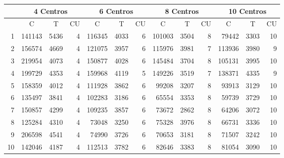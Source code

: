 \documentclass{article}
\begin{document}
  \begin{center}
    \begin{tabular}{ | r | r | r | r | r | r | r | r | r | r | r | r | r | }
      \hline
      \rowcolor{DarkGrey}
      & \multicolumn{3}{|c|}{4 Centros} & \multicolumn{3}{c|}{6 Centros} & \multicolumn{3}{|c|}{8 Centros} & \multicolumn{3}{|c|}{10 Centros} \\ \hline
      \rowcolor{DarkGrey}
      \multicolumn{1}{|c|}{Réplica} & \multicolumn{1}{|c|}{C} & \multicolumn{1}{|c|}{T} & \multicolumn{1}{|c|}{CU} & \multicolumn{1}{|c|}{C} & \multicolumn{1}{|c|}{T} & \multicolumn{1}{|c|}{CU} & \multicolumn{1}{|c|}{C} & \multicolumn{1}{|c|}{T} & \multicolumn{1}{|c|}{CU} & \multicolumn{1}{|c|}{C} & \multicolumn{1}{|c|}{T} & \multicolumn{1}{|c|}{CU} \\ \hline \hline
      1 & 141143 & 5436 & 4 & 116345 & 4033 & 6 & 101003 & 3504 & 8 & 79442 & 3303 & 10 \\ \hline
      \rowcolor{LightGrey}
      2 & 156574 & 4669 & 4 & 121075 & 3957 & 6 & 115976 & 3981 & 7 & 113936 & 3980 & 9 \\ \hline
      3 & 219954 & 4073 & 4 & 150877 & 4028 & 6 & 145484 & 3704 & 8 & 105131 & 3995 & 10 \\ \hline
      \rowcolor{LightGrey}
      4 & 199729 & 4353 & 4 & 159968 & 4119 & 5 & 149226 & 3519 & 7 & 138371 & 4335 & 9\\ \hline
      5 & 158359 & 4012 & 4 & 111928 & 3862 & 6 & 99208 & 3207 & 8 & 93913 & 3129 & 10\\ \hline
      \rowcolor{LightGrey}
      6 & 135497 & 3841 & 4 & 102283 & 3186 & 6 & 65554 & 3353 & 8 & 59739 & 3729 & 10  \\ \hline
      7 & 150857 & 4299 & 4 & 109235 & 3857 & 6 & 73672 & 2862 & 8 & 64206 & 3072 & 10  \\ \hline
      \rowcolor{LightGrey}
      8 & 125284 & 4310 & 4 & 73048 & 3250 & 6 & 75328 & 3976 & 8 & 66731 & 3336 & 10  \\ \hline
      9 & 206598 & 4541 & 4 & 74990 & 3726 & 6 & 70653 & 3181 & 8 & 71507 & 3242 & 10 \\ \hline
      \rowcolor{LightGrey}
      10 & 142046 & 4187 & 4 & 112513 & 3782 & 6 & 82646 & 3383 & 8 & 81054 & 3090 & 10 \\ \hline
    \end{tabular}
    \label{table:T3}
  \end{center}
\end{document}
